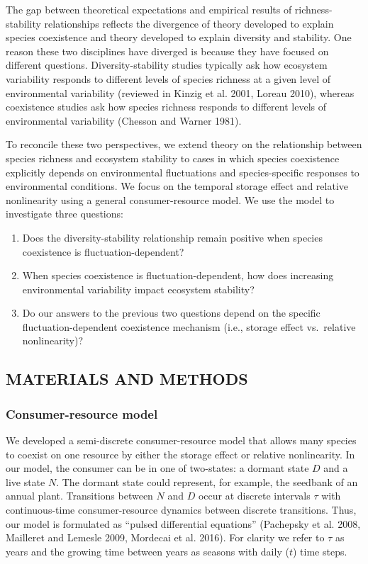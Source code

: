 \documentclass[12pt,]{article}
\begin{document}
The gap between theoretical expectations and empirical results of
richness-stability relationships reflects the divergence of theory
developed to explain species coexistence and theory developed to explain
diversity and stability. One reason these two disciplines have diverged
is because they have focused on different questions. Diversity-stability
studies typically ask how ecosystem variability responds to different
levels of species richness at a given level of environmental variability
(reviewed in Kinzig et al. 2001, Loreau 2010), whereas coexistence
studies ask how species richness responds to different levels of
environmental variability (Chesson and Warner 1981).

To reconcile these two perspectives, we extend theory on the
relationship between species richness and ecosystem stability to cases
in which species coexistence explicitly depends on environmental
fluctuations and species-specific responses to environmental conditions.
We focus on the temporal storage effect and relative nonlinearity using
a general consumer-resource model. We use the model to investigate three
questions:

\begin{enumerate}
\def\labelenumi{\arabic{enumi}.}
\item
  Does the diversity-stability relationship remain positive when species
  coexistence is fluctuation-dependent?
\item
  When species coexistence is fluctuation-dependent, how does increasing
  environmental variability impact ecosystem stability?
\item
  Do our answers to the previous two questions depend on the specific
  fluctuation-dependent coexistence mechanism (i.e., storage effect
  vs.~relative nonlinearity)?
\end{enumerate}

\subsection{MATERIALS AND METHODS}\label{materials-and-methods}

\subsubsection{Consumer-resource model}\label{consumer-resource-model}

We developed a semi-discrete consumer-resource model that allows many
species to coexist on one resource by either the storage effect or
relative nonlinearity. In our model, the consumer can be in one of
two-states: a dormant state \(D\) and a live state \(N\). The dormant
state could represent, for example, the seedbank of an annual plant.
Transitions between \(N\) and \(D\) occur at discrete intervals \(\tau\)
with continuous-time consumer-resource dynamics between discrete
transitions. Thus, our model is formulated as ``pulsed differential
equations'' (Pachepsky et al. 2008, Mailleret and Lemesle 2009, Mordecai
et al. 2016). For clarity we refer to \(\tau\) as years and the growing
time between years as seasons with daily (\(t\)) time steps.
\end{document}
